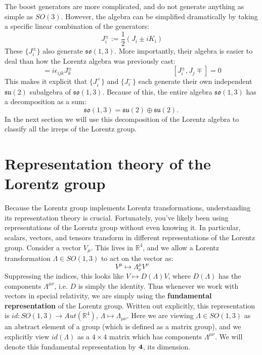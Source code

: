 \documentclass[11pt, oneside]{article}   	%
\theoremstyle{definition}
\begin{document}
The boost generators are more complicated, and do not generate anything as simple as $SO(3)$. However, the algebra can 
be simplified dramatically by taking a specific linear combination of the generators:
\begin{equation}
	J_i^\pm := \frac{1}{2}(J_i \pm iK_i)
\end{equation}
These $\{J_i^\pm\}$ also generate $\mathfrak{so}(1, 3)$. More importantly, their algebra is easier to deal than how the 
Lorentz algebra was previously cast:
\begin{equation}
	[J_i^\pm, J_j^\pm] = i\epsilon_{ijk} J_k^\pm \;\;\;\;\;\;\;\;\;\;\;\;\;\;\;\;\;\;\;\;\;\;\;\;\;\;\;\;\;\;\;\;\;\;\;\;\;\;\;\;\;\;\;\;\;\;\;\;\;\;\;
	[J_i^\pm, J_j\mp] = 0
\end{equation}
This makes it explicit that $\{J_i^+\}$ and $\{J_i^-\}$ each generate their own independent $\mathfrak{su}(2)$ subalgebra 
of $\mathfrak{so}(1, 3)$. Because of this, the entire algebra $\mathfrak{so}(1, 3)$ has a decomposition as a sum:
\begin{equation}
	\mathfrak{so}(1, 3) = \mathfrak{su}(2)\oplus\mathfrak{su}(2).~
	\label{eq:lorentz_decomp}
\end{equation}
In the next section we will use this decomposition of the Lorentz algebra to classify all the irreps of the Lorentz group.

\newpage
\section{Representation theory of the Lorentz group}

Because the Lorentz group implements Lorentz transformations, understanding its representation theory is crucial. 
Fortunately, you've likely been using representations of the Lorentz group without even knowing it. In particular, scalars, 
vectors, and tensors transform in different representations of the Lorentz group. Consider a vector $V_\mu$. This lives 
in $\mathbb R^4$, and we allow a Lorentz transformation $\Lambda\in SO(1, 3)$ to act on the vector as:
\begin{equation}
	V^\mu\mapsto \Lambda^\mu_\nu V^\nu
\end{equation}
Suppressing the indices, this looks like $V\mapsto D(\Lambda) V$, where $D(\Lambda)$ has the components 
$\Lambda^{\mu\nu}$, i.e. $D$ is simply the identity. Thus whenever we work with vectors in special relativity, we are 
simply using the \textbf{fundamental representation} of the Lorentz group. Written out explicitly, this representation is 
$id : SO(1, 3)\rightarrow Aut(\mathbb R^4)$, $\Lambda\mapsto \Lambda_{\mu\nu}$. Here we are viewing $\Lambda
\in SO(1, 3)$ as an abstract element of a group (which is defined as a matrix group), and we explicitly view $id(\Lambda)$ 
as a $4\times 4$ matrix which has components $\Lambda^{\mu\nu}$. We will denote this fundamental representation 
by $\bf{4}$, its dimension.
\end{document}
